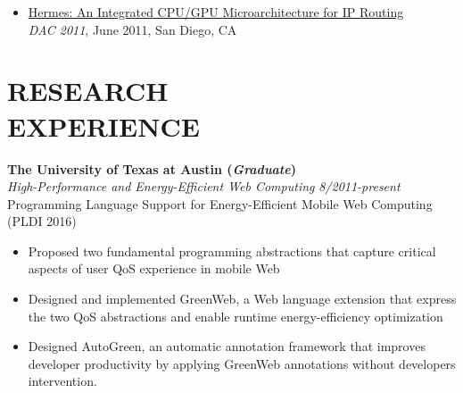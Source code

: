\documentclass[margin, 9pt]{res} %
\begin{document}
\begin{resume}
\begin{itemize}[leftmargin=*]
	\item \href{https://speakerdeck.com/queeten/gpu-microarchitecture-for-ip-routing}{Hermes: An Integrated CPU/GPU Microarchitecture for IP Routing}\\[2pt]
          \textit{DAC 2011}, June 2011, San Diego, CA
\end{itemize}


\section{RESEARCH\\ EXPERIENCE}

{\large\textbf{The University of Texas at Austin (\textit{Graduate})}}\\

\vspace*{-7pt}
{\large \textit{High-Performance and Energy-Efficient Web Computing}} \hfill\textit{8/2011-present}\\

\vspace*{-7pt}
Programming Language Support for Energy-Efficient Mobile Web Computing \hfill(PLDI 2016)\\
\vspace*{-10pt}
\begin{itemize}[leftmargin=*] \itemsep -3pt
\vspace*{-5pt}
	\item Proposed two fundamental programming abstractions that capture critical aspects of user QoS experience in mobile Web
	\item Designed and implemented GreenWeb, a Web language extension that express the two QoS abstractions and enable runtime energy-efficiency optimization
	\item Designed AutoGreen, an automatic annotation framework that improves developer productivity by applying GreenWeb annotations without developers intervention.
\end{itemize}


\end{resume}
\end{document}
